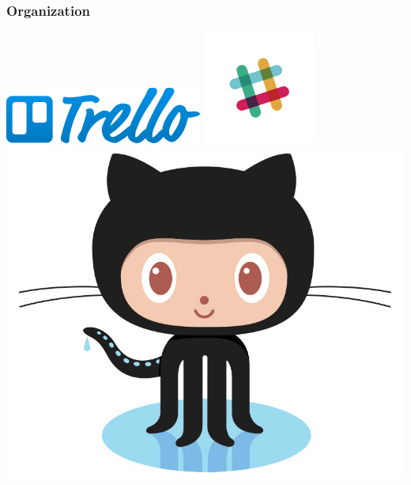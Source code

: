 \begin{frame}
	\frametitle{Organization}
	\begin{center}
	\includegraphics[scale=0.4]{figs/trello.png}
	\includegraphics[scale=0.4]{figs/slack.png}
	\includegraphics[scale=0.1]{figs/Octocat.jpg}
	\end{center}
\end{frame}
